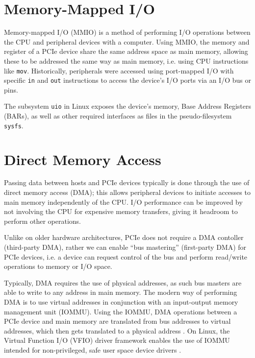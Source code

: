 

\section{Memory-Mapped I/O}
Memory-mapped I/O (MMIO) is a method of performing I/O operations between the CPU and peripheral devices with a computer. Using MMIO, the memory and register of a PCIe device share the same address space as main memory, allowing these to be addressed the same way as main memory, i.e. using CPU instructions like \texttt{mov}. Historically, peripherals were accessed using port-mapped I/O with specific \texttt{in} and \texttt{out} instructions to access the device's I/O ports via an I/O bus or pins.

The subsystem \texttt{uio} in Linux exposes the device's memory, Base Address Registers (BARs), as well as other required interfaces as files in the pseudo-filesystem \texttt{sysfs}.

\section{Direct Memory Access}
Passing data between hosts and PCIe devices typically is done through the use of direct memory access (DMA); this allows peripheral devices to initiate accesses to main memory independently of the CPU. I/O performance can be improved by not involving the CPU for expensive memory transfers, giving it headroom to perform other operations.

Unlike on older hardware architectures, PCIe does not require a DMA contoller (third-party DMA), rather we can enable ``bus mastering'' (first-party DMA) for PCIe devices, i.e. a device can request control of the bus and perform read/write operations to memory or I/O space.

Typically, DMA requires the use of physical addresses, as such bus masters are able to write to any address in main memory. The modern way of performing DMA is to use virtual addresses in conjunction with an input-output memory management unit (IOMMU). Using the IOMMU, DMA operations between a PCIe device and main memory are translated from bus addresses to virtual addresses, which then gets translated to a physical address \cite{spdk-dma}. On Linux, the Virtual Function I/O (VFIO) driver framework enables the use of IOMMU intended for non-privileged, safe user space device drivers \cite{vfio}.


